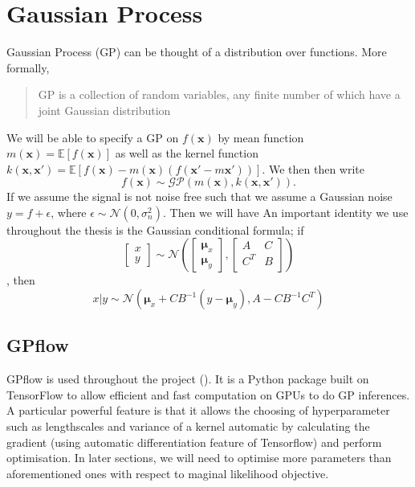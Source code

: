 \documentclass{statsmsc}
\begin{document}
\section{Gaussian Process}
Gaussian Process (GP) can be thought of a distribution over functions. \cite{rasmussen_williams_2006}
More formally, \begin{quote}GP is a collection of random variables, any finite number of which have a joint Gaussian distribution\end{quote}
We will be able to specify a GP on $f(\mathbf{x})$ by mean function $m(\mathbf{x})=\mathbb{E}[f(\mathbf{x})]$ as well as the kernel function $k(\mathbf{x}, \mathbf{x'})=\mathbb{E}[f(\mathbf{x})-m(\mathbf{x})(f(\mathbf{x'}-m{\mathbf{x'}}))]$.
We then then write
$$
f(\mathbf{x})\sim\mathcal{GP}(m(\mathbf{x}),k(\mathbf{x},\mathbf{x'})).
$$
If we assume the signal is not noise free such that we assume a Gaussian noise $y=f+\epsilon$, where $\epsilon\sim\mathcal{N}(0, \sigma_n^2)$.
Then we will have 
An important identity we use throughout the thesis is the Gaussian conditional formula; if
$$
  \begin{bmatrix}
    x\\y
  \end{bmatrix} 
  \sim \mathcal{N}
  \left(
    \begin{bmatrix}
      \mathbf{\mu}_x\\
      \mathbf{\mu}_y
    \end{bmatrix},
    \begin{bmatrix}
      A & C \\
      C^T & B\\
    \end{bmatrix}
  \right)
$$, 
then 
\begin{equation}
  x|y\sim \mathcal{N}\left(\mathbf{\mu}_x+CB^{-1}(y-\mathbf{\mu}_y),A-CB^{-1}C^T\right)
  \label{equ:normal_condtion}
\end{equation}

\subsection{GPflow}
GPflow is used throughout the project (\cite{GPflow2017}).
It is a Python package built on TensorFlow to allow efficient and fast computation on GPUs to do GP inferences.
A particular powerful feature is that it allows the choosing of hyperparameter such as lengthscales and variance of a kernel automatic by calculating the gradient (using automatic differentiation feature of Tensorflow) and perform optimisation.
In later sections, we will need to optimise more parameters than aforementioned ones with respect to maginal likelihood objective.
\end{document}
